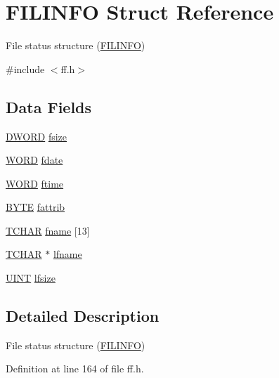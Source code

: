 \hypertarget{structFILINFO}{}\section{F\+I\+L\+I\+N\+FO Struct Reference}
\label{structFILINFO}


File status structure (\hyperlink{structFILINFO}{F\+I\+L\+I\+N\+FO})  




{\ttfamily \#include $<$ff.\+h$>$}

\subsection*{Data Fields}
\begin{DoxyCompactItemize}
\item 
\hyperlink{integer_8h_ad342ac907eb044443153a22f964bf0af}{D\+W\+O\+RD} \hyperlink{structFILINFO_aee7441af7dc0c443d1e1e6011cc7dcac}{fsize}
\item 
\hyperlink{integer_8h_a197942eefa7db30960ae396d68339b97}{W\+O\+RD} \hyperlink{structFILINFO_a7c01c48a15b1b49da459924437b0bd52}{fdate}
\item 
\hyperlink{integer_8h_a197942eefa7db30960ae396d68339b97}{W\+O\+RD} \hyperlink{structFILINFO_ae0f751b79621bf7b29669f177bbe6b9a}{ftime}
\item 
\hyperlink{integer_8h_a4ae1dab0fb4b072a66584546209e7d58}{B\+Y\+TE} \hyperlink{structFILINFO_a838d542585831b085537b363f18205c0}{fattrib}
\item 
\hyperlink{ff_8h_a03bdb8ce5895c7e261aadc2529637546}{T\+C\+H\+AR} \hyperlink{structFILINFO_abd852510f2f79b4ec773156d8942dc7c}{fname} \mbox{[}13\mbox{]}
\item 
\hyperlink{ff_8h_a03bdb8ce5895c7e261aadc2529637546}{T\+C\+H\+AR} $\ast$ \hyperlink{structFILINFO_ac4506c29e0219130dff46b01a1b5c023}{lfname}
\item 
\hyperlink{integer_8h_a36cb3b01d81ffd844bbbfb54003e06ec}{U\+I\+NT} \hyperlink{structFILINFO_a2527c511ff4d12d285dbf3c4b3c9fb7b}{lfsize}
\end{DoxyCompactItemize}


\subsection{Detailed Description}
File status structure (\hyperlink{structFILINFO}{F\+I\+L\+I\+N\+FO}) 

Definition at line 164 of file ff.\+h.



